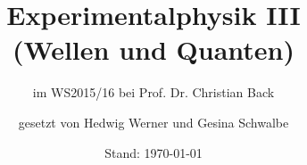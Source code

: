 \usepackage[utf8]{inputenc}
\usepackage[T1]{fontenc}
\usepackage{babel}
\usepackage{csquotes}
\usepackage{lmodern}
\usepackage{microtype}
\usepackage{makeidx}
\makeindex
%
% 
\usepackage[intoc]{nomencl}
\makenomenclature
\usepackage[backend=biber]{biblatex}


\usepackage{color}

\usepackage{amsmath}
\usepackage{mathtools}
\usepackage{amssymb}
\usepackage{dsfont}
\usepackage{amsthm}
\usepackage[
output-decimal-marker={,},
exponent-product=\cdot,
per-mode=fraction]
{siunitx}
\usepackage{booktabs}
\usepackage{enumerate}

\usepackage[%
pdftitle={Experimentalphysik III (Wellen und Quanten)},
pdfauthor={Hedwig Werner}]%
{hyperref}
\usepackage{tabularx}
\usepackage{graphicx}
\usepackage{wrapfig}
\usepackage{gensymb}

\setcounter{secnumdepth}{4}
\renewcommand{\theparagraph}{\alph{paragraph})} 

\subject{Vorlesungsmitschrift}
\title{Experimentalphysik III\\ (Wellen und Quanten)}
\subtitle{im WS2015/16 bei Prof. Dr. Christian Back}
\date{Stand: \today}
\author{gesetzt von Hedwig Werner und Gesina Schwalbe}


